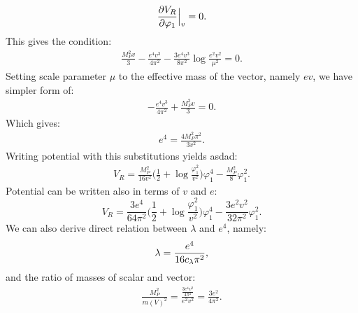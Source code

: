 \begin{align}
\frac{\partial V_R}{\partial \varphi_1} \Big|_v= 0.
\end{align}
This gives the condition:
\begin{align}
\frac{M_P^2v}{3}-\frac{e^4v^3}{4\pi^2}-\frac{3e^4v^3}{8\pi^2}\log\frac{e^2v^2}{\mu^2}=0.
\end{align}
Setting scale parameter $\mu$ to the effective mass of the vector, namely $ev$, we have 
simpler form of:
\begin{align}
-\frac{e^4v^3}{4\pi^2}+\frac{M_P^2v}{3}=0.
\end{align}
Which gives:
\begin{align}
e^4 = \frac{4M_P^2\pi^2}{3v^2}.
\end{align}
Writing potential with this substitutions yields asdad:
\begin{align}
V_R = \frac{M_P^2}{16v^2}\Big(\frac{1}{2}+\log\frac{\varphi_1^2}{v^2}\Big)\varphi_1^4- 
\frac{M_P^2}{8}\varphi_1^2.
\end{align}
Potential can be written also in terms of $v$ and $e$:
\begin{equation}\label{resulthalfhalf}
V_R=\frac{3e^4}{64\pi^2}\Big(\frac{1}{2}+\log\frac{\varphi_1^2}{v^2}\Big)\varphi_1^4- 
\frac{3e^2v^2}{32\pi^2}\varphi_1^2.
\end{equation}
We can also derive direct relation between $\lambda$ and $e^4$, namely:
\begin{align}
\lambda = \frac{e^4}{16c_\lambda\pi^2},
\end{align}
and the ratio of masses of scalar and vector:
\begin{align}
\frac{M_P^2}{m(V)^2} = \frac{\frac{3e^4v^2}{4\pi^2}}{e^2v^2} = \frac{3e^2}{4\pi^2}.
\end{align}
